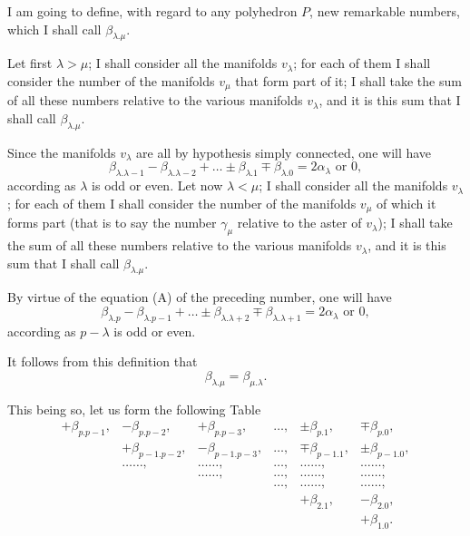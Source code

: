 \documentclass{article}
\begin{document}
I am going to define, with regard to any polyhedron $P$, new remarkable numbers, which I shall call $\beta_{\lambda.\mu}$.

Let first $\lambda > \mu$; I shall consider all the manifolds $v_{\lambda}$; for each of them I shall consider the number of the manifolds $v_{\mu}$ that form part of it; I shall take the sum of all these numbers relative to the various manifolds $v_{\lambda}$, and it is this sum that I shall call $\beta_{\lambda.\mu}$.

Since the manifolds $v_{\lambda}$ are all by hypothesis simply connected, one will have
\[ \beta_{\lambda.\lambda-1} - \beta_{\lambda.\lambda-2} + \ldots \pm \beta_{\lambda.1} \mp \beta_{\lambda.0} = 2\alpha_{\lambda} \text{ or } 0, \]
according as $\lambda$ is odd or even.
Let now $\lambda < \mu$; I shall consider all the manifolds $v_{\lambda}$; for each of them I shall consider the number of the manifolds $v_{\mu}$ of which it forms part (that is to say the number $\gamma_{\mu}$ relative to the aster of $v_{\lambda}$); I shall take the sum of all these numbers relative to the various manifolds $v_{\lambda}$, and it is this sum that I shall call $\beta_{\lambda.\mu}$.

By virtue of the equation (A) of the preceding number, one will have
\[ \beta_{\lambda.p} - \beta_{\lambda.p-1} + \ldots \pm \beta_{\lambda.\lambda+2} \mp \beta_{\lambda.\lambda+1} = 2\alpha_{\lambda} \text{ or } 0, \]
according as $p - \lambda$ is odd or even.

It follows from this definition that
\[ \beta_{\lambda.\mu} = \beta_{\mu.\lambda}. \]

This being so, let us form the following Table
\[ \begin{matrix} +\beta_{p.p-1}, & -\beta_{p.p-2}, & +\beta_{p.p-3}, & \ldots, & \pm\beta_{p.1}, & \mp\beta_{p.0}, \\[1ex] & +\beta_{p-1.p-2}, & -\beta_{p-1.p-3}, & \ldots, & \mp\beta_{p-1.1}, & \pm\beta_{p-1.0}, \\[1ex] & \ldots\ldots, & \ldots\ldots, & \ldots, & \ldots\ldots, & \ldots\ldots, \\[1ex] & & \ldots\ldots, & \ldots, & \ldots\ldots, & \ldots\ldots, \\[1ex] & & & \ldots, & \ldots\ldots, & \ldots\ldots, \\[1ex] & & & & +\beta_{2.1}, & -\beta_{2.0}, \\[1ex] & & & & & +\beta_{1.0}. \end{matrix} \]
\end{document}
